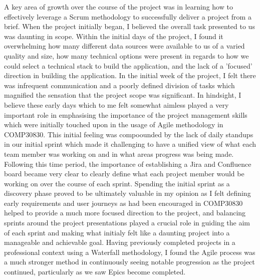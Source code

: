\documentclass{scrreprt}
\begin{document}
A key area of growth over the course of the project was in learning how to effectively leverage a Scrum methodology to successfully deliver a project from a brief. When the project initially began, I believed the overall task presented to us was daunting in scope. Within the initial days of the project, I found it overwhelming how many different data sources were available to us of a varied quality and size, how many technical options were present in regards to how we could select a technical stack to build the application, and the lack of a 'focused' direction in building the application. In the initial week of the project, I felt there was infrequent communication and a poorly defined division of tasks which magnified the sensation that the project scope was significant. In hindsight, I believe these early days which to me felt somewhat aimless played a very important role in emphasising the importance of the project management skills which were initially touched upon in the usage of Agile methodology in COMP30830. This initial feeling was compoounded by the lack of daily standups in our initial sprint which made it challenging to have a unified view of what each team member was working on and in what areas progress was being made. Following this time period, the importance of establishing a Jira and Confluence board became very clear to clearly define what each project member would be working on over the course of each sprint. Spending the initial sprint as a discovery phase proved to be ultimately valuable in my opinion as I felt defining early requirements and user journeys as had been encouraged in COMP30830 helped to provide a much more focused direction to the project, and balancing sprints around the project presentations played a crucial role in guiding the aim of each sprint and making what initialy felt like a daunting project into a manageable and achievable goal. Having previously completed projects in a professional context using a Waterfall methodology, I found the Agile process was a much stronger method in continuously seeing notable progression as the project continued, particularly as we saw Epics become completed.
\newline
\newline 
\end{document}
